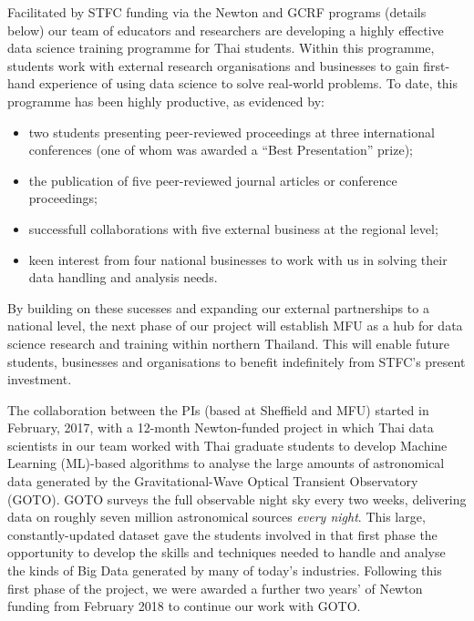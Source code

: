 \documentclass[11pt]{article}
\begin{document}
  Facilitated by STFC funding via the Newton and GCRF programs (details below) our team of educators and researchers are developing a highly effective data science training programme for Thai students. Within this programme, students work with external research organisations and businesses to gain first-hand experience of using data science to solve real-world problems. To date, this programme has been highly productive, as evidenced by:
  \begin{itemize}
    \item two students presenting peer-reviewed proceedings at three international conferences (one of whom was awarded a ``Best Presentation'' prize);
    \item the publication of five peer-reviewed journal articles or conference proceedings;
    \item successfull collaborations with five external business at the regional level;
    \item keen interest from four national businesses to work with us in solving their data handling and analysis needs.
  \end{itemize}
  By building on these sucesses and expanding our external partnerships to a national level, the next phase of our project will establish MFU as a hub for data science research and training within northern Thailand. This will enable future students, businesses and organisations to benefit indefinitely from STFC's present investment.
  
  The collaboration between the PIs (based at Sheffield and MFU) started in February, 2017, with a 12-month Newton-funded project in which Thai data scientists in our team worked with Thai graduate students to develop Machine Learning (ML)-based algorithms to analyse the large amounts of astronomical data generated by the Gravitational-Wave Optical Transient Observatory (GOTO). GOTO surveys the full observable night sky every two weeks, delivering data on roughly seven million astronomical sources {\it every night}. This large, constantly-updated dataset gave the students involved in that first phase the opportunity to develop the skills and techniques needed to handle and analyse the kinds of Big Data generated by many of today's industries. Following this first phase of the project, we were awarded a further two years' of Newton funding from February 2018 to continue our work with GOTO. 
  
\end{document}

